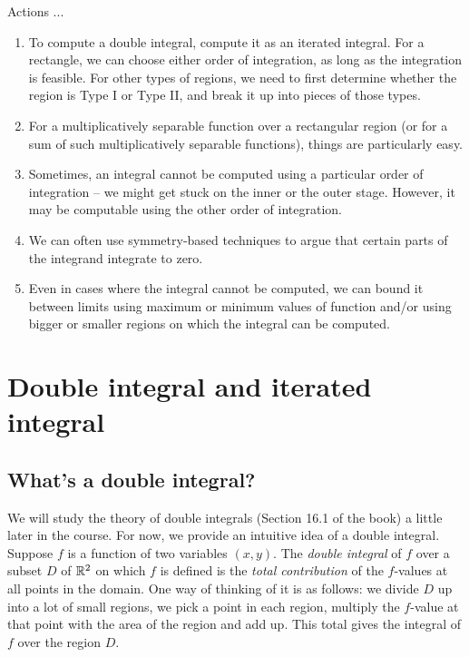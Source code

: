 \documentclass[10pt]{amsart}
\begin{document}
Actions ...

\begin{enumerate}
\item To compute a double integral, compute it as an iterated
  integral. For a rectangle, we can choose either order of
  integration, as long as the integration is feasible. For other types
  of regions, we need to first determine whether the region is Type I
  or Type II, and break it up into pieces of those types.
\item For a multiplicatively separable function over a rectangular
  region (or for a sum of such multiplicatively separable functions),
  things are particularly easy.
\item Sometimes, an integral cannot be computed using a particular
  order of integration -- we might get stuck on the inner or the outer
  stage. However, it may be computable using the other order of
  integration.
\item We can often use symmetry-based techniques to argue that certain
  parts of the integrand integrate to zero.
\item Even in cases where the integral cannot be computed, we can
  bound it between limits using maximum or minimum values of function
  and/or using bigger or smaller regions on which the integral can be
  computed.
\end{enumerate}

\section{Double integral and iterated integral}

\subsection{What's a double integral?}

We will study the theory of double integrals (Section 16.1 of the
book) a little later in the course. For now, we provide an intuitive
idea of a double integral. Suppose $f$ is a function of two variables
$(x,y)$. The {\em double integral} of $f$ over a subset $D$ of $\mathbb{R}^2$
on which $f$ is defined is the {\em total contribution} of the
$f$-values at all points in the domain. One way of thinking of it is
as follows: we divide $D$ up into a lot of small regions, we pick a
point in each region, multiply the $f$-value at that point with the
area of the region and add up. This total gives the integral of $f$
over the region $D$.
\end{document}
